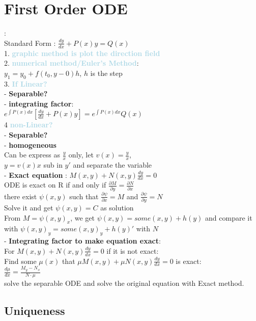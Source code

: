 \documentclass[twocolumn]{article}
\newcommand{\method}[1]{\textbf{\textcolor{lightblue}{#1}}}
\newcommand{\sectionspace}{\vspace*{1em}}
\begin{document}
\section{First Order ODE}
:\\
Standard Form : $\frac{dy}{dx} + P(x)y = Q(x)$\\
1. \method{graphic method is plot the direction field}\\
2. \method{numerical method/Euler's Method}:\\
$y_1 = y_0 + f(t_0,y-0)h$, $h$ is the step\\
3. \method{If Linear?}\\
- \textbf{Separable?}\\
- \textbf{integrating factor}:\\
$e^{\int P(x) dx}[\frac{dy}{dx} + P(x)y ]= e^{\int P(x) dx}Q(x)$\\
4  \method{non-Linear?}\\
- \textbf{Separable?}\\
- \textbf{homogeneous}\\
Can be express as $\frac{y}{x}$ only, let $v(x) = \frac{y}{x}$,\\ 
$y = v(x)x$
sub in $ y'$ and separate the variable\\
- \textbf{Exact equation} : $M(x,y) + N(x, y)\frac{dy}{dx} = 0$  \\
ODE  is exact on R if and only if $ \frac{\partial{M}}{\partial{y}} =  \frac{\partial{N}}{\partial{x}}$\\
there exist $\psi(x, y )$ such that $\frac{\partial{\psi}}{\partial{x}} =  M$ and $\frac{\partial{\psi}}{\partial{y}} = N$\\
Solve it  and get $\psi(x, y) = C$ as solution\\
From $M = \psi(x ,y)_x$, we get $\psi(x,y) = some(x, y) + h(y)$ and compare it with $\psi(x,y)_y =  some(x,y)_y + h(y)'$ with $N$\\
- \textbf{Integrating factor to make equation exact}:\\
For $M(x,y) + N(x, y)\frac{dy}{dx} = 0$ if it is not exact:\\
Find some $\mu(x)$ that $\mu M(x,y) + \mu N(x, y)\frac{dy}{dx} = 0$ is exact:\\
$\frac{d \mu}{dx} = \frac{M_y - N_x}{N \cdot \mu}$\\
solve the separable ODE and solve the original equation with Exact method.

\sectionspace

\subsection{Uniqueness}
 
\end{document}
